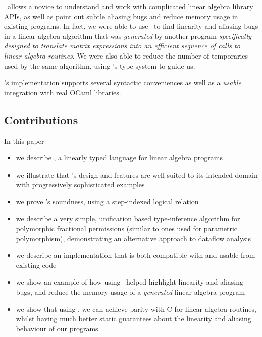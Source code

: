 \lang\ allows a novice to understand and work with complicated linear
algebra library APIs, as well as point out subtle aliasing bugs and
reduce memory usage in existing programs. In fact, we were able to use
\lang\ to find linearity and aliasing bugs in a linear algebra
algorithm that was \emph{generated} by another program
\emph{specifically designed to translate matrix expressions into an
  efficient sequence of calls to linear algebra routines}. We were
also able to reduce the number of temporaries used by the same
algorithm, using \lang's type system to guide us.

\lang's implementation supports several syntactic conveniences as well as a
\emph{usable} integration with real OCaml libraries.

\subsection{Contributions}

In this paper
\begin{itemize}
    \item we describe \lang, a linearly typed language for linear algebra programs
    \item we illustrate that \lang's design and features are well-suited to its
        intended domain with progressively sophisticated examples
    \item we prove \lang's soundness, using a step-indexed logical relation
    \item we describe a very simple, unification based type-inference algorithm
        for polymorphic fractional permissions (similar to ones used for
        parametric polymorphism), demonstrating an alternative approach to
        dataflow analysis \cite{bierhoff}
    \item we describe an implementation that is both compatible with and usable
        from existing code
    \item we show an example of how using \lang\ helped highlight linearity
        and aliasing bugs, and reduce the memory usage of a \emph{generated}
        linear algebra program
    \item we show that using \lang, we can achieve parity with C for linear
        algebra routines, whilst having much better static guarantees about the
        linearity and aliasing behaviour of our programs.
\end{itemize}

